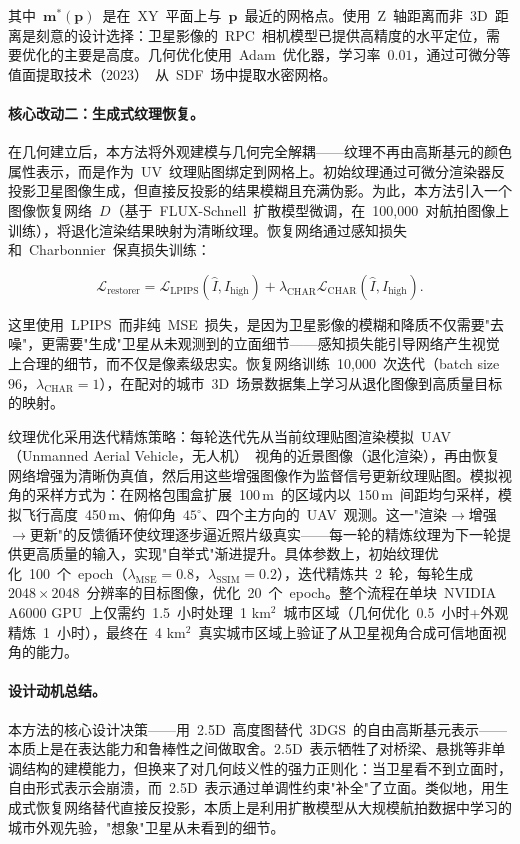 其中~$\mathbf{m}^*(\mathbf{p})$~是在~XY~平面上与~$\mathbf{p}$~最近的网格点。使用~Z~轴距离而非~3D~距离是刻意的设计选择：卫星影像的~RPC~相机模型已提供高精度的水平定位，需要优化的主要是高度。几何优化使用~Adam~优化器，学习率~$0.01$，通过可微分等值面提取技术（2023）~\cite{shen2023flexible}从~SDF~场中提取水密网格。

\paragraph{核心改动二：生成式纹理恢复。}
在几何建立后，本方法将外观建模与几何完全解耦——纹理不再由高斯基元的颜色属性表示，而是作为~UV~纹理贴图绑定到网格上。初始纹理通过可微分渲染器反投影卫星图像生成，但直接反投影的结果模糊且充满伪影。为此，本方法引入一个图像恢复网络~$D$（基于~FLUX-Schnell~扩散模型微调，在~100{,}000~对航拍图像上训练），将退化渲染结果映射为清晰纹理。恢复网络通过感知损失和~Charbonnier~保真损失训练：

\begin{equation}
    \mathcal{L}_{\text{restorer}} = \mathcal{L}_{\text{LPIPS}}(\hat{I}, I_{\text{high}}) + \lambda_{\text{CHAR}} \mathcal{L}_{\text{CHAR}}(\hat{I}, I_{\text{high}}).
\end{equation}

这里使用~LPIPS~而非纯~MSE~损失，是因为卫星影像的模糊和降质不仅需要"去噪"，更需要"生成"卫星从未观测到的立面细节——感知损失能引导网络产生视觉上合理的细节，而不仅是像素级忠实。恢复网络训练~10{,}000~次迭代（batch size~$96$，$\lambda_{\text{CHAR}} = 1$），在配对的城市~3D~场景数据集上学习从退化图像到高质量目标的映射。

纹理优化采用迭代精炼策略：每轮迭代先从当前纹理贴图渲染模拟~UAV（Unmanned Aerial Vehicle，无人机）~视角的近景图像（退化渲染），再由恢复网络增强为清晰伪真值，然后用这些增强图像作为监督信号更新纹理贴图。模拟视角的采样方式为：在网格包围盒扩展~100\,m~的区域内以~150\,m~间距均匀采样，模拟飞行高度~450\,m、俯仰角~$45^{\circ}$、四个主方向的~UAV~观测。这一"渲染$\to$增强$\to$更新"的反馈循环使纹理逐步逼近照片级真实——每一轮的精炼纹理为下一轮提供更高质量的输入，实现"自举式"渐进提升。具体参数上，初始纹理优化~100~个~epoch（$\lambda_{\text{MSE}} = 0.8$，$\lambda_{\text{SSIM}} = 0.2$），迭代精炼共~2~轮，每轮生成~$2048 \times 2048$~分辨率的目标图像，优化~20~个~epoch。整个流程在单块~NVIDIA A6000 GPU~上仅需约~1.5~小时处理~1 km$^2$~城市区域（几何优化~0.5~小时+外观精炼~1~小时），最终在~4 km$^2$~真实城市区域上验证了从卫星视角合成可信地面视角的能力。

\paragraph{设计动机总结。}
本方法的核心设计决策——用~2.5D~高度图替代~3DGS~的自由高斯基元表示——本质上是在表达能力和鲁棒性之间做取舍。2.5D~表示牺牲了对桥梁、悬挑等非单调结构的建模能力，但换来了对几何歧义性的强力正则化：当卫星看不到立面时，自由形式表示会崩溃，而~2.5D~表示通过单调性约束"补全"了立面。类似地，用生成式恢复网络替代直接反投影，本质上是利用扩散模型从大规模航拍数据中学习的城市外观先验，"想象"卫星从未看到的细节。

